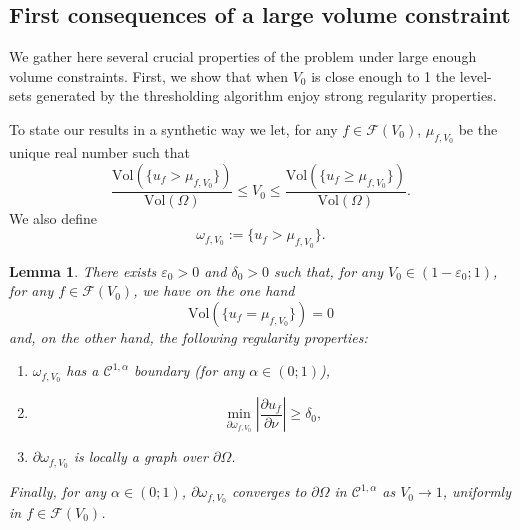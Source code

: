 \documentclass{article}
\renewcommand{\geq}{\geqslant}
\renewcommand{\leq}{\leqslant}
\def\e{{\varepsilon}}
\newtheorem{lemma}[material]{Lemma}
\def\O{{\Omega}}
\numberwithin{equation}{section}
\begin{document}
\subsection{First consequences of a large volume constraint}
We gather here several crucial properties of the problem under large enough volume constraints. First, we show that when $V_0$ is close enough to 1 the level-sets generated by the thresholding algorithm enjoy strong regularity properties.

To state our results in a synthetic way we let, for any $f\in \mathcal F(V_0)$, $\mu_{f,V_0}$ be the unique real number such that 
\[ \frac{\mathrm{Vol}(\{u_f>\mu_{f,V_0}\})}{\mathrm{Vol}(\O)}\leq V_0\leq  \frac{\mathrm{Vol}(\{u_f\geq \mu_{f,V_0}\})}{\mathrm{Vol}(\O)}.\]
We also define 
\[ \omega_{f,V_0}:=\{ u_f>\mu_{f,V_0}\}.\]
\begin{lemma}\label{Le:V0Lagrange}
There exists $\e_0>0$ and $\delta_0>0$ such that, for any $V_0\in (1-\e_0;1)$, for any $f\in \mathcal F(V_0)$, we have on the one hand
\[ \mathrm{Vol}(\{ u_f=\mu_{f,V_0}\})=0\] and, on the other hand, the following regularity properties:
\begin{enumerate}
\item $\omega_{f,V_0}$ has a $\mathscr C^{1,\alpha}$ boundary (for any $\alpha \in (0;1)$),
\item
\[ \min_{\partial \omega_{f,V_0}} \left| \frac{\partial u_f}{\partial \nu} \right|\geq \delta_0,\]
\item $\partial \omega_{f,V_0}$ is locally a graph over $\partial \O$.
\end{enumerate}
Finally, for any $\alpha \in (0;1)$, $\partial \omega_{f,V_0}$ converges to $\partial \O$ in $\mathscr C^{1,\alpha}$ as $V_0\to 1$, uniformly in $f\in \mathcal F(V_0)$.
\end{lemma}
\end{document}
